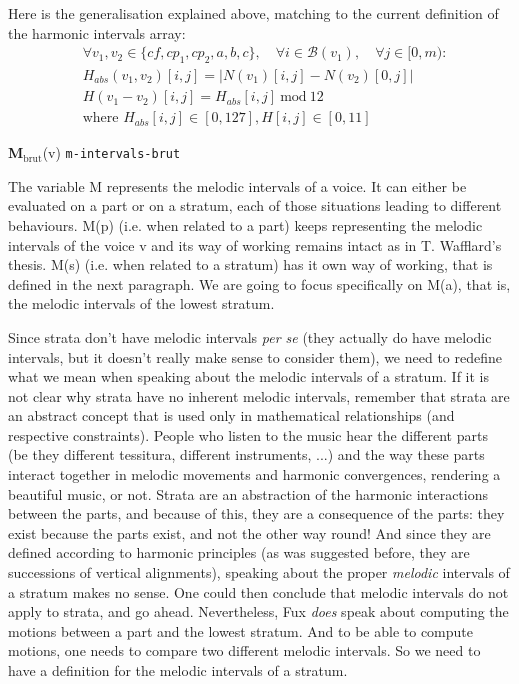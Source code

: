 Here is the generalisation explained above, matching to the current definition of the harmonic intervals array:
\begin{equation}
\begin{aligned}
    &\forall v_1, v_2 \in \{\mathit{cf}, cp_1, cp_2, a, b, c\}, \quad \forall i \in \mathcal{B}(v_1), \quad \forall j \in [0, m):\\
    &H_{abs}(v_1,v_2)[i, j] = \left|N(v_1)[i, j] - N(v_2)[0,j]\right|\\
    &H(v_1-v_2)[i, j] = H_{abs}[i, j]\ \text{mod}\ 12\\
    &\text{where } H_{abs}[i, j] \in [0, 127], H[i, j] \in [0, 11]
\end{aligned}
\end{equation}

\vspace{.5cm}
\noindent \textbf{M}$_{\text{brut}}$(v) \hspace*{.2cm} \texttt{m-intervals-brut}

The variable M represents the melodic intervals of a voice. It can either be evaluated on a part or on a stratum, each of those situations leading to different behaviours. M(p) (i.e. when related to a part) keeps representing the melodic intervals of the voice v and its way of working remains intact as in T. Wafflard's thesis. M(s) (i.e. when related to a stratum) has it own way of working, that is defined in the next paragraph. We are going to focus specifically on M(a), that is, the melodic intervals of the lowest stratum.

Since strata don't have melodic intervals \textit{per se} (they actually do have melodic intervals, but it doesn't really make sense to consider them), we need to redefine what we mean when speaking about the melodic intervals of a stratum. If it is not clear why strata have no inherent melodic intervals, remember that strata are an abstract concept that is used only in mathematical relationships (and respective constraints). People who listen to the music hear the different parts (be they different tessitura, different instruments, ...) and the way these parts interact together in melodic movements and harmonic convergences, rendering a beautiful music, or not. Strata are an abstraction of the harmonic interactions between the parts, and because of this, they are a consequence of the parts: they exist because the parts exist, and not the other way round! And since they are defined according to harmonic principles (as was suggested before, they are successions of vertical alignments), speaking about the proper \textit{melodic} intervals of a stratum makes no sense. One could then conclude that melodic intervals do not apply to strata, and go ahead. Nevertheless, Fux \textit{does} speak about computing the motions between a part and the lowest stratum. And to be able to compute motions, one needs to compare two different melodic intervals. So we need to have a definition for the melodic intervals of a stratum. 


